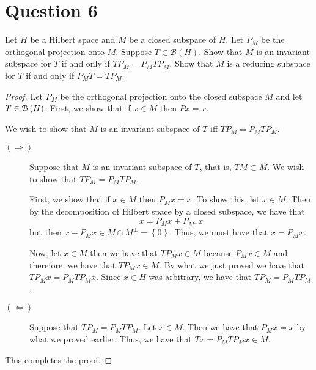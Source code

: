 \section{Question 6}
\horz

Let $H$ be a Hilbert space and $M$ be a closed subspace of $H$. Let $P_M$ be the orthogonal projection onto $M.$ Suppose $T\in \mathcal B(H).$ Show that $M$ is an invariant subspace for $T$ if and only if $TP_M = P_MTP_M.$ Show that $M$ is a reducing subspace for $T$ if and only if $P_MT=TP_M.$

\horz

\begin{proof}
    Let $P_{M}$ be the orthogonal projection onto the closed subspace $M$ and let $T\in {\cal B} \left( H \right)$. First, we show that if $x \in M$ then $Px =x$.

    We wish to show that $M$ is an invariant subspace of $T$ iff $TP_{M}=P_{M}TP_{M}$.

    \begin{description}
	\item[$\left( \Longrightarrow \right)$] Suppose that $M$ is an invariant subspace of $T$, that is, $TM \subset M$. We wish to show that $TP_{M} = P_{M}TP_{M}$.

	    First, we show that if $x\in M$ then $P_{M}x=x$. To show this, let $x\in M$. Then by the decomposition of Hilbert space by a closed subspace, we have that
	    \begin{equation*}
		x=P_{M}x + P_{M^{\perp}}x
	    \end{equation*}
	    but then $x-P_{M}x \in M \cap M^{\perp} = \left\{ 0 \right\}$. Thus, we must have that $x=P_{M}x$.

	    Now, let $x\in M$ then we have that $TP_{M}x \in M$ because $P_{M}x \in M$ and therefore, we have that $TP_{M}x \in M$. By what we just proved we have that $TP_{M}x = P_{M}TP_{M}x$. Since $x\in H$ was arbitrary, we have that $TP_{M} = P_{M} TP_{M}$.
	\item[$\left( \Longleftarrow \right)$] Suppose that $TP_{M}=P_{M}TP_{M}$. Let $x\in M$. Then we have that $P_Mx =x$ by what we proved earlier. Thus, we have that $Tx=P_{M}TP_{M}x \in M$.
    \end{description}
    This completes the proof.
	\end{proof}
